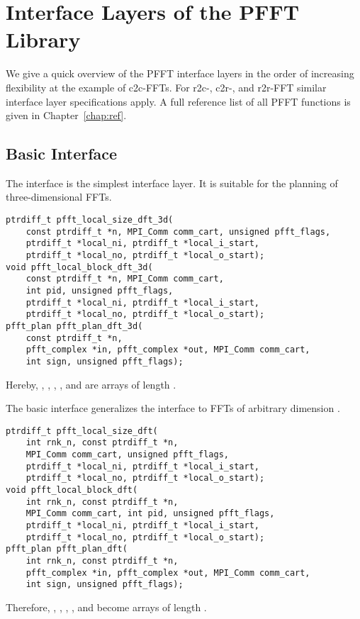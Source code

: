 \chapter{Interface Layers of the PFFT Library}\label{chap:api}
We give a quick overview of the PFFT interface layers in the order of increasing flexibility at the example of c2c-FFTs.
For r2c-, c2r-, and r2r-FFT similar interface layer specifications apply. A full reference list of all PFFT functions is given in Chapter~\ref{chap:ref}. 
\section{Basic Interface}
The  interface is the simplest interface layer. It is suitable for the planning of three-dimensional FFTs.
\begin{lstlisting}
ptrdiff_t pfft_local_size_dft_3d(
    const ptrdiff_t *n, MPI_Comm comm_cart, unsigned pfft_flags,
    ptrdiff_t *local_ni, ptrdiff_t *local_i_start,
    ptrdiff_t *local_no, ptrdiff_t *local_o_start);
void pfft_local_block_dft_3d(
    const ptrdiff_t *n, MPI_Comm comm_cart,
    int pid, unsigned pfft_flags,
    ptrdiff_t *local_ni, ptrdiff_t *local_i_start,
    ptrdiff_t *local_no, ptrdiff_t *local_o_start);
pfft_plan pfft_plan_dft_3d(
    const ptrdiff_t *n,
    pfft_complex *in, pfft_complex *out, MPI_Comm comm_cart,
    int sign, unsigned pfft_flags);
\end{lstlisting}
Hereby, , , , , and  are
 arrays of length .

The basic interface generalizes the  interface to FFTs of arbitrary dimension .
\begin{lstlisting}
ptrdiff_t pfft_local_size_dft(
    int rnk_n, const ptrdiff_t *n,
    MPI_Comm comm_cart, unsigned pfft_flags,
    ptrdiff_t *local_ni, ptrdiff_t *local_i_start,
    ptrdiff_t *local_no, ptrdiff_t *local_o_start);
void pfft_local_block_dft(
    int rnk_n, const ptrdiff_t *n,
    MPI_Comm comm_cart, int pid, unsigned pfft_flags,
    ptrdiff_t *local_ni, ptrdiff_t *local_i_start,
    ptrdiff_t *local_no, ptrdiff_t *local_o_start);
pfft_plan pfft_plan_dft(
    int rnk_n, const ptrdiff_t *n,
    pfft_complex *in, pfft_complex *out, MPI_Comm comm_cart,
    int sign, unsigned pfft_flags);
\end{lstlisting}
Therefore, , , , , and  become
arrays of length .

